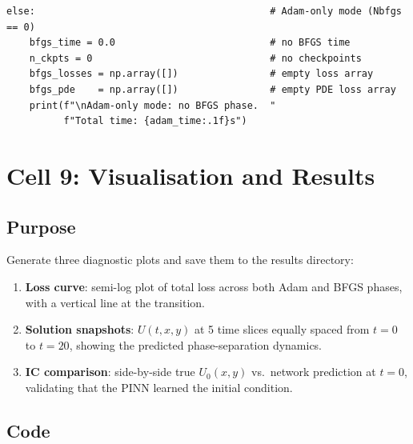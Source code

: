 \documentclass[11pt,a4paper]{article}
\begin{document}
\begin{lstlisting}
else:                                         # Adam-only mode (Nbfgs == 0)
    bfgs_time = 0.0                           # no BFGS time
    n_ckpts = 0                               # no checkpoints
    bfgs_losses = np.array([])                # empty loss array
    bfgs_pde    = np.array([])                # empty PDE loss array
    print(f"\nAdam-only mode: no BFGS phase.  "
          f"Total time: {adam_time:.1f}s")
\end{lstlisting}


\section{Cell 9: Visualisation and Results}
\label{sec:viz}

\subsection*{Purpose}

Generate three diagnostic plots and save them to the results directory:

\begin{enumerate}[nosep]
  \item \textbf{Loss curve}: semi-log plot of total loss across both
        Adam and BFGS phases, with a vertical line at the transition.
  \item \textbf{Solution snapshots}: $U(t,x,y)$ at 5 time slices
        equally spaced from $t=0$ to $t=20$, showing the predicted
        phase-separation dynamics.
  \item \textbf{IC comparison}: side-by-side true $U_0(x,y)$ vs.\
        network prediction at $t=0$, validating that the PINN learned
        the initial condition.
\end{enumerate}

\subsection*{Code}
\end{document}
